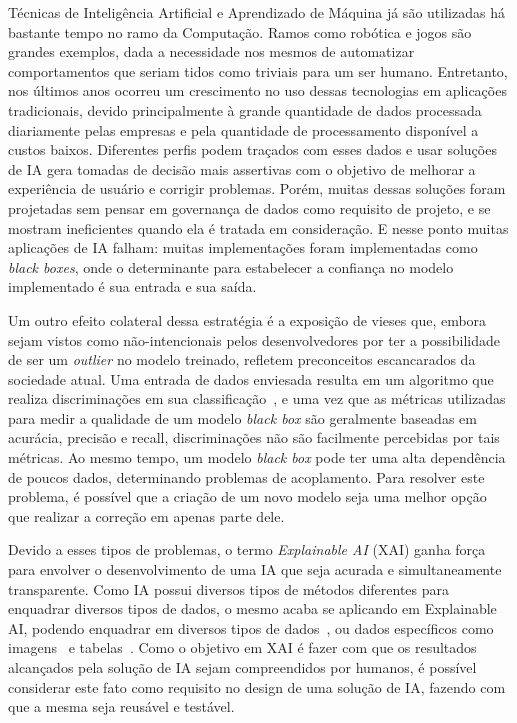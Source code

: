 \documentclass[twocolumn]{article}
\begin{document}
Técnicas de Inteligência Artificial e Aprendizado de Máquina já são utilizadas há bastante tempo no ramo da Computação. Ramos como robótica e jogos são grandes exemplos, dada a necessidade nos mesmos de automatizar comportamentos que seriam tidos como triviais para um ser humano. Entretanto, nos últimos anos ocorreu um crescimento no uso dessas tecnologias em aplicações tradicionais, devido principalmente à grande quantidade de dados processada diariamente pelas empresas e pela quantidade de processamento disponível a custos baixos. Diferentes perfis podem traçados com esses dados e usar soluções de IA gera tomadas de decisão mais assertivas com o objetivo de melhorar a experiência de usuário e corrigir problemas. Porém, muitas dessas soluções foram projetadas sem pensar em governança de dados como requisito de projeto, e se mostram ineficientes quando ela é tratada em consideração. E nesse ponto muitas aplicações de IA falham: muitas implementações foram implementadas como \textit{black boxes}, onde o determinante para estabelecer a confiança no modelo implementado é sua entrada e sua saída.

Um outro efeito colateral dessa estratégia é a exposição de vieses que, embora sejam vistos como não-intencionais pelos desenvolvedores por ter a possibilidade de ser um \textit{outlier} no modelo treinado, refletem preconceitos escancarados da sociedade atual. Uma entrada de dados enviesada resulta em um algoritmo que realiza discriminações em sua classificação~\citep{Buolamwini_2018}, e uma vez que as métricas utilizadas para medir a qualidade de um modelo \textit{black box} são geralmente baseadas em acurácia, precisão e recall, discriminações não são facilmente percebidas por tais métricas. Ao mesmo tempo, um modelo \textit{black box} pode ter uma alta dependência de poucos dados, determinando problemas de acoplamento. Para resolver este problema, é possível que a criação de um novo modelo seja uma melhor opção que realizar a correção em apenas parte dele.

Devido a esses tipos de problemas, o termo \textit{Explainable AI} (XAI) ganha força para envolver o desenvolvimento de uma IA que seja acurada e simultaneamente transparente. Como IA possui diversos tipos de métodos diferentes para enquadrar diversos tipos de dados, o mesmo acaba se aplicando em Explainable AI, podendo enquadrar em diversos tipos de dados~\citep{Sundararajan_2017}, ou dados específicos como imagens~\citep{Kapishnikov_2019} e tabelas~\citep{Maleki_2013}. Como o objetivo em XAI é fazer com que os resultados alcançados pela solução de IA sejam compreendidos por humanos, é possível considerar este fato como requisito no design de uma solução de IA, fazendo com que a mesma seja reusável e testável.
\end{document}
